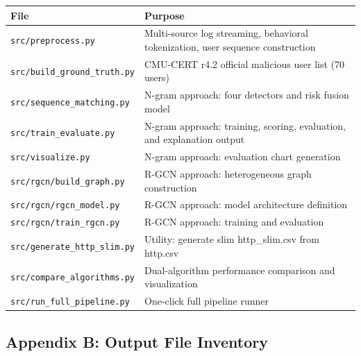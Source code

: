 \documentclass[
  a4paper,
  11pt]{article}
\newcounter{none} %
\begin{document}
{\def\LTcaptype{none} %
\begin{longtable}[]{@{}ll@{}}
\toprule\noalign{}
File & Purpose \\
\midrule\noalign{}
\endhead
\bottomrule\noalign{}
\endlastfoot
\texttt{src/preprocess.py} & Multi-source log streaming, behavioral
tokenization, user sequence construction \\
\texttt{src/build\_ground\_truth.py} & CMU-CERT r4.2 official malicious
user list (70 users) \\
\texttt{src/sequence\_matching.py} & N-gram approach: four detectors and
risk fusion model \\
\texttt{src/train\_evaluate.py} & N-gram approach: training, scoring,
evaluation, and explanation output \\
\texttt{src/visualize.py} & N-gram approach: evaluation chart
generation \\
\texttt{src/rgcn/build\_graph.py} & R-GCN approach: heterogeneous graph
construction \\
\texttt{src/rgcn/rgcn\_model.py} & R-GCN approach: model architecture
definition \\
\texttt{src/rgcn/train\_rgcn.py} & R-GCN approach: training and
evaluation \\
\texttt{src/generate\_http\_slim.py} & Utility: generate slim
http\_slim.csv from http.csv \\
\texttt{src/compare\_algorithms.py} & Dual-algorithm performance
comparison and visualization \\
\texttt{src/run\_full\_pipeline.py} & One-click full pipeline runner \\
\end{longtable}
}

\subsection{Appendix B: Output File
Inventory}\label{appendix-b-output-file-inventory}
\end{document}
